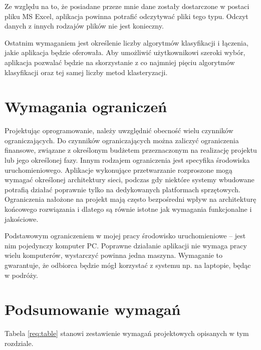 \documentclass[../thesis.tex]{subfiles}
\begin{document}
Ze względu na to, że posiadane przeze mnie dane zostały dostarczone w postaci pliku MS Excel, aplikacja powinna potrafić odczytywać pliki tego typu. Odczyt danych z innych rodzajów plików nie jest konieczny.

Ostatnim wymaganiem jest określenie liczby algorytmów klasyfikacji i łączenia, jakie aplikacja będzie oferowała. Aby umożliwić użytkownikowi szeroki wybór, aplikacja pozwalać będzie na skorzystanie z co najmniej pięciu algorytmów klasyfikacji oraz tej samej liczby metod klasteryzacji.

\section{Wymagania ograniczeń}

Projektując oprogramowanie, należy uwzględnić obecność wielu czynników ograniczających. Do czynników ograniczających można zaliczyć ograniczenia finansowe, związane z określonym budżetem przeznaczonym na realizację projektu lub jego określonej fazy. Innym rodzajem ograniczenia jest specyfika środowiska uruchomieniowego. Aplikacje wykonujące przetwarzanie rozproszone mogą wymagać określonej architektury sieci, podczas gdy niektóre systemy wbudowane potrafią działać poprawnie tylko na dedykowanych platformach sprzętowych. Ograniczenia nałożone na projekt mają często bezpośredni wpływ na architekturę końcowego rozwiązania i dlatego są równie istotne jak wymagania funkcjonalne i jakościowe.

Podstawowym ograniczeniem w mojej pracy środowisko uruchomieniowe -- jest nim pojedynczy komputer PC. Poprawne działanie aplikacji nie wymaga pracy wielu komputerów, wystarczyć powinna jedna maszyna. Wymaganie to gwarantuje, że odbiorca będzie mógł korzystać z systemu np. na laptopie, będąc w podróży.

\section{Podsumowanie wymagań}

Tabela \ref{req:table} stanowi zestawienie wymagań projektowych opisanych w tym rozdziale.
\end{document}
